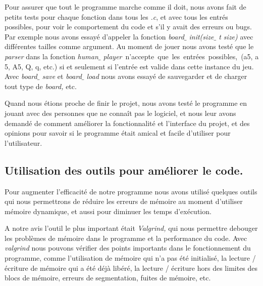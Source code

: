 \documentclass[a4paper,12pt]{article}
\begin{document}
\noindent \begin{justify}
Pour assurer que tout le programme marche comme il doit, nous avons fait de petits tests pour chaque fonction dans tous les \textit{.c}, et avec tous les entrés possibles, pour voir le comportement du code et s’il y avait des erreurs ou bugs. Par exemple nous avons essayé d’appeler la fonction \textit{board$ \_ $ init(size$ \_ $ t size) }avec différentes tailles comme argument. Au moment de jouer nous avons testé que le \textit{parser} dans la fonction \textit{human$ \_ $ player}~n’accepte~que~les~entrées~possibles,~(a5, a       5, A5, Q, q, etc.) si et seulement si l’entrée est valide dans cette instance du jeu. Avec \textit{board$ \_ $ save }et \textit{board$ \_ $ load} nous avons essayé de sauvegarder et de charger tout type de \textit{board, }etc.
\end{justify}\par

\noindent \begin{justify}
Quand nous étions proche de finir le projet, nous avons testé le programme en jouant avec des personnes que ne connaît pas le logiciel, et nous leur avons demandé de comment améliorer la fonctionnalité et l’interface du projet, et des opinions pour savoir si le programme était amical et facile d’utiliser pour l’utilisateur.
\end{justify}\par


\vspace{\baselineskip}
	\subsection{Utilisation des outils pour améliorer le code.}\par


\noindent \begin{justify}
Pour augmenter l’efficacité de notre programme nous avons utilisé quelques outils qui nous permettrons de réduire les erreurs de mémoire au moment d’utiliser mémoire dynamique, et aussi pour diminuer les temps d’exécution. 
\end{justify}\par


\noindent \begin{justify}
A notre avis l’outil le plus important était \textit{Valgrind, }qui nous permettre debouger les problèmes de mémoire dans le programme et la performance du code. Avec \textit{valgrind} nous pouvons vérifier des points importants dans le fonctionnement du programme, comme l’utilisation de mémoire qui n’a pas été initialisé, la lecture / écriture de mémoire qui a été déjà libéré, la lecture / écriture hors des limites des blocs de mémoire, erreurs de segmentation, fuites de mémoire, etc.
\end{justify}\par
\end{document}
